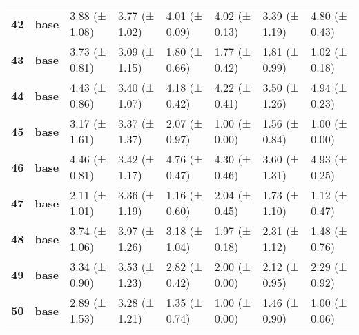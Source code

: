 \begin{longtable}{llllllll}
\cline{1-8}
\textbf{42} & \textbf{base} & 3.88 (± 1.08) & 3.77 (± 1.02) & 4.01 (± 0.09) & 4.02 (± 0.13) & 3.39 (± 1.19) & 4.80 (± 0.43) \\
\cline{1-8}
\textbf{43} & \textbf{base} & 3.73 (± 0.81) & 3.09 (± 1.15) & 1.80 (± 0.66) & 1.77 (± 0.42) & 1.81 (± 0.99) & 1.02 (± 0.18) \\
\cline{1-8}
\textbf{44} & \textbf{base} & 4.43 (± 0.86) & 3.40 (± 1.07) & 4.18 (± 0.42) & 4.22 (± 0.41) & 3.50 (± 1.26) & 4.94 (± 0.23) \\
\cline{1-8}
\textbf{45} & \textbf{base} & 3.17 (± 1.61) & 3.37 (± 1.37) & 2.07 (± 0.97) & 1.00 (± 0.00) & 1.56 (± 0.84) & 1.00 (± 0.00) \\
\cline{1-8}
\textbf{46} & \textbf{base} & 4.46 (± 0.81) & 3.42 (± 1.17) & 4.76 (± 0.47) & 4.30 (± 0.46) & 3.60 (± 1.31) & 4.93 (± 0.25) \\
\cline{1-8}
\textbf{47} & \textbf{base} & 2.11 (± 1.01) & 3.36 (± 1.19) & 1.16 (± 0.60) & 2.04 (± 0.45) & 1.73 (± 1.10) & 1.12 (± 0.47) \\
\cline{1-8}
\textbf{48} & \textbf{base} & 3.74 (± 1.06) & 3.97 (± 1.26) & 3.18 (± 1.04) & 1.97 (± 0.18) & 2.31 (± 1.12) & 1.48 (± 0.76) \\
\cline{1-8}
\textbf{49} & \textbf{base} & 3.34 (± 0.90) & 3.53 (± 1.23) & 2.82 (± 0.42) & 2.00 (± 0.00) & 2.12 (± 0.95) & 2.29 (± 0.92) \\
\cline{1-8}
\textbf{50} & \textbf{base} & 2.89 (± 1.53) & 3.28 (± 1.21) & 1.35 (± 0.74) & 1.00 (± 0.00) & 1.46 (± 0.90) & 1.00 (± 0.06) \\
\cline{1-8}
\end{longtable}
